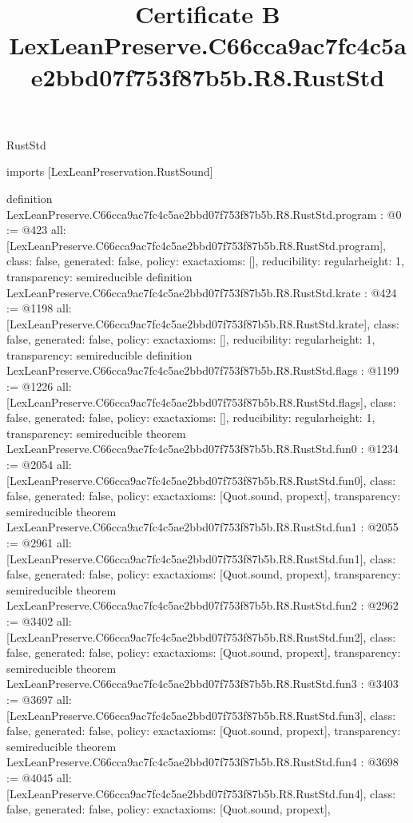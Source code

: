 \begin{lexlean}{RustStd}
\title{Certificate B LexLeanPreserve.C66cca9ac7fc4c5ae2bbd07f753f87b5b.R8.RustStd}
\begin{coremodule}
imports [LexLeanPreservation.RustSound]

definition LexLeanPreserve.C66cca9ac7fc4c5ae2bbd07f753f87b5b.R8.RustStd.program : @0 := @423 {
  all: [LexLeanPreserve.C66cca9ac7fc4c5ae2bbd07f753f87b5b.R8.RustStd.program],
  class: false,
  generated: false,
  policy: exact{axioms: []},
  reducibility: regular{height: 1},
  transparency: semireducible
}
definition LexLeanPreserve.C66cca9ac7fc4c5ae2bbd07f753f87b5b.R8.RustStd.krate : @424 := @1198 {
  all: [LexLeanPreserve.C66cca9ac7fc4c5ae2bbd07f753f87b5b.R8.RustStd.krate],
  class: false,
  generated: false,
  policy: exact{axioms: []},
  reducibility: regular{height: 1},
  transparency: semireducible
}
definition LexLeanPreserve.C66cca9ac7fc4c5ae2bbd07f753f87b5b.R8.RustStd.flags : @1199 := @1226 {
  all: [LexLeanPreserve.C66cca9ac7fc4c5ae2bbd07f753f87b5b.R8.RustStd.flags],
  class: false,
  generated: false,
  policy: exact{axioms: []},
  reducibility: regular{height: 1},
  transparency: semireducible
}
theorem LexLeanPreserve.C66cca9ac7fc4c5ae2bbd07f753f87b5b.R8.RustStd.fun0 : @1234 := @2054 {
  all: [LexLeanPreserve.C66cca9ac7fc4c5ae2bbd07f753f87b5b.R8.RustStd.fun0],
  class: false,
  generated: false,
  policy: exact{axioms: [Quot.sound, propext]},
  transparency: semireducible
}
theorem LexLeanPreserve.C66cca9ac7fc4c5ae2bbd07f753f87b5b.R8.RustStd.fun1 : @2055 := @2961 {
  all: [LexLeanPreserve.C66cca9ac7fc4c5ae2bbd07f753f87b5b.R8.RustStd.fun1],
  class: false,
  generated: false,
  policy: exact{axioms: [Quot.sound, propext]},
  transparency: semireducible
}
theorem LexLeanPreserve.C66cca9ac7fc4c5ae2bbd07f753f87b5b.R8.RustStd.fun2 : @2962 := @3402 {
  all: [LexLeanPreserve.C66cca9ac7fc4c5ae2bbd07f753f87b5b.R8.RustStd.fun2],
  class: false,
  generated: false,
  policy: exact{axioms: [Quot.sound, propext]},
  transparency: semireducible
}
theorem LexLeanPreserve.C66cca9ac7fc4c5ae2bbd07f753f87b5b.R8.RustStd.fun3 : @3403 := @3697 {
  all: [LexLeanPreserve.C66cca9ac7fc4c5ae2bbd07f753f87b5b.R8.RustStd.fun3],
  class: false,
  generated: false,
  policy: exact{axioms: [Quot.sound, propext]},
  transparency: semireducible
}
theorem LexLeanPreserve.C66cca9ac7fc4c5ae2bbd07f753f87b5b.R8.RustStd.fun4 : @3698 := @4045 {
  all: [LexLeanPreserve.C66cca9ac7fc4c5ae2bbd07f753f87b5b.R8.RustStd.fun4],
  class: false,
  generated: false,
  policy: exact{axioms: [Quot.sound, propext]},
}
\end{coremodule}
\end{lexlean}

